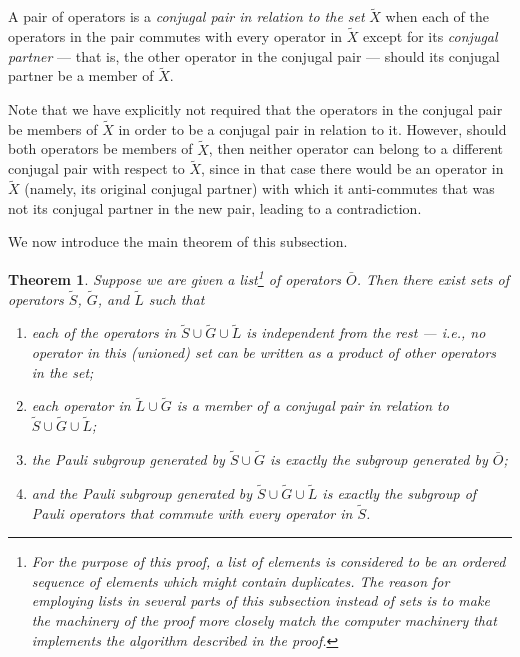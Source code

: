 \documentclass[twocolumn,showpacs,preprintnumbers,amsmath,amssymb,nofootinbib,pra,floatfix]{revtex4}
\newtheorem{theorem}{Theorem}
\newenvironment{definition}[1][Definition]{\begin{trivlist}
\item[\hskip \labelsep {\bfseries #1}]}{\end{trivlist}}
\newcommand{\lst}{\bar}
\newcommand{\set}{\tilde}
\begin{document}
\begin{definition} A pair of operators is a \emph{conjugal pair in relation to the set} $\set X$ when each of the operators in the pair commutes with every operator in $\set X$ except for its \emph{conjugal partner} --- that is, the other operator in the conjugal pair --- should its conjugal partner be a member of $\set X$.
\end{definition}

Note that we have explicitly not required that the operators in the conjugal pair be members of $\set X$ in order to be a conjugal pair in relation to it.  However, should both operators be members of $\set X$, then neither operator can belong to a different conjugal pair with respect to $\set X$, since in that case there would be an operator in $\set X$ (namely, its original conjugal partner) with which it anti-commutes that was not its conjugal partner in the new pair, leading to a contradiction.

We now introduce the main theorem of this subsection.

\begin{theorem} \label{theorem-SG} Suppose we are given a list\footnote{For the purpose of this proof, a list of elements is considered to be an ordered sequence of elements which might contain duplicates.  The reason for employing lists in several parts of this subsection instead of sets is to make the machinery of the proof more closely match the computer machinery that implements the algorithm described in the proof.}
 of operators $\lst O$.  Then there exist sets of operators $\set S$, $\set G$, and $\set L$ such that
\begin{enumerate}
\item each of the operators in $\set S \cup \set G \cup \set L$ is independent from the rest --- i.e., no operator in this (unioned) set can be written as a product of other operators in the set;
\item each operator in $\set L \cup \set G$ is a member of a conjugal pair in relation to $\set S \cup \set G \cup \set L$;
\item the Pauli subgroup generated by $\set S \cup \set G$ is exactly the subgroup generated by $\lst O$;
\item and the Pauli subgroup generated by $\set S \cup \set G \cup \set L$ is exactly the subgroup of Pauli operators that commute with every operator in $\set S$.
\end{enumerate}
\end{theorem}
\end{document}
